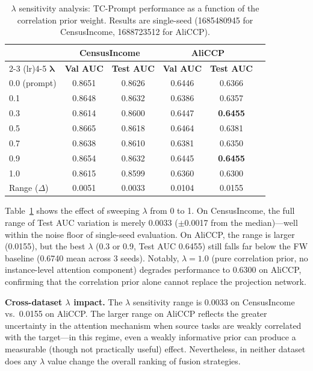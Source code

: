 \documentclass[review,anonymous]{acmart}
\begin{document}
\begin{table}[t]
  \centering
  \caption{$\lambda$ sensitivity analysis: TC-Prompt performance as a function
           of the correlation prior weight. Results are single-seed (1685480945
           for CensusIncome, 1688723512 for AliCCP).}
  \label{tab:lambda_sensitivity}
  \begin{tabular}{lccccc}
    \toprule
    & \multicolumn{2}{c}{\textbf{CensusIncome}} & \multicolumn{2}{c}{\textbf{AliCCP}} \\
    \cmidrule(lr){2-3} \cmidrule(lr){4-5}
    $\boldsymbol{\lambda}$ & \textbf{Val AUC} & \textbf{Test AUC} & \textbf{Val AUC} & \textbf{Test AUC} \\
    \midrule
    0.0 (prompt) & 0.8651 & 0.8626 & 0.6446 & 0.6366 \\
    0.1          & 0.8648 & 0.8632 & 0.6386 & 0.6357 \\
    0.3          & 0.8614 & 0.8600 & 0.6447 & \textbf{0.6455} \\
    0.5          & 0.8665 & 0.8618 & 0.6464 & 0.6381 \\
    0.7          & 0.8638 & 0.8610 & 0.6381 & 0.6350 \\
    0.9          & 0.8654 & 0.8632 & 0.6445 & \textbf{0.6455} \\
    1.0          & 0.8615 & 0.8599 & 0.6360 & 0.6300 \\
    \midrule
    Range ($\Delta$) & 0.0051 & 0.0033 & 0.0104 & 0.0155 \\
    \bottomrule
  \end{tabular}
\end{table}

Table~\ref{tab:lambda_sensitivity} shows the effect of sweeping $\lambda$ from
0 to 1. On CensusIncome, the full range of Test AUC variation is merely 0.0033
($\pm$0.0017 from the median)---well within the noise floor of single-seed
evaluation. On AliCCP, the range is larger (0.0155), but the best $\lambda$
(0.3 or 0.9, Test AUC 0.6455) still falls far below the FW baseline (0.6740
mean across 3 seeds). Notably, $\lambda=1.0$ (pure correlation prior, no
instance-level attention component) degrades performance to 0.6300 on AliCCP,
confirming that the correlation prior alone cannot replace the projection
network.

\textbf{Cross-dataset $\lambda$ impact.} The $\lambda$ sensitivity range is
0.0033 on CensusIncome vs.\ 0.0155 on AliCCP. The larger range on AliCCP
reflects the greater uncertainty in the attention mechanism when source tasks
are weakly correlated with the target---in this regime, even a weakly informative
prior can produce a measurable (though not practically useful) effect.
Nevertheless, in neither dataset does any $\lambda$ value change the overall
ranking of fusion strategies.
\end{document}
